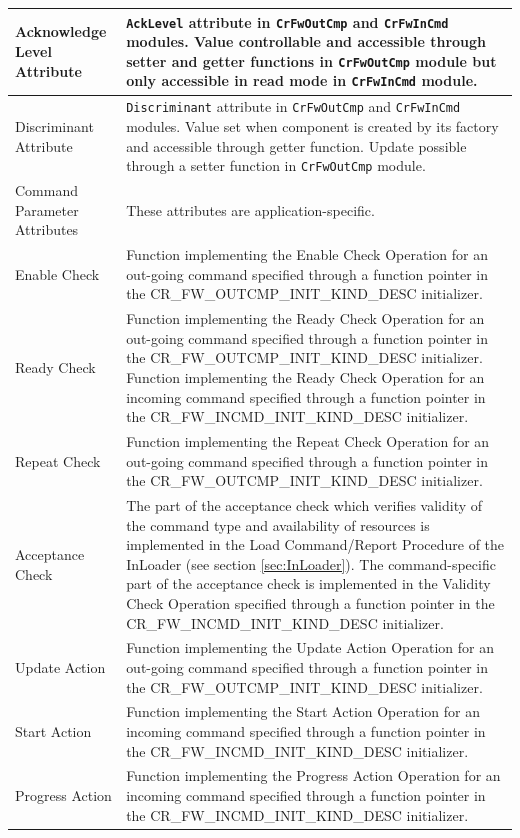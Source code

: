 \documentclass[a4paper,10pt]{article}
\begin{document}
\begin{longtable}{|>{\raggedright}p{2.0cm}|p{9.3cm}|}
\hline
Acknowledge Level Attribute & \texttt{AckLevel} attribute in \texttt{CrFwOutCmp} and \texttt{CrFwInCmd} modules. Value controllable and accessible through setter and getter functions in \texttt{CrFwOutCmp} module but only accessible in read mode in \texttt{CrFwInCmd} module. \\
\hline
Discriminant Attribute & \texttt{Discriminant} attribute in \texttt{CrFwOutCmp} and \texttt{CrFwInCmd} modules. Value set when component is created by its factory and accessible through getter function. Update possible through a setter function in \texttt{CrFwOutCmp} module.  \\
\hline
Command Parameter Attributes & These attributes are application-specific.  \\
\hline
Enable Check & Function implementing the Enable Check Operation for an out-going command specified through a function pointer in the CR\_FW\_OUTCMP\_INIT\_KIND\_DESC initializer.  \\
\hline
Ready Check & Function implementing the Ready Check Operation for an out-going command specified through a function pointer in the CR\_FW\_OUTCMP\_INIT\_KIND\_DESC initializer. Function implementing the Ready Check Operation for an incoming command specified through a function pointer in the CR\_FW\_INCMD\_INIT\_KIND\_DESC initializer. \\
\hline
Repeat Check & Function implementing the Repeat Check Operation for an out-going command specified through a function pointer in the CR\_FW\_OUTCMP\_INIT\_KIND\_DESC initializer.  \\
\hline
Acceptance Check & The part of the acceptance check which verifies validity of the command type and availability of resources is implemented in the Load Command/Report Procedure of the InLoader (see section \ref{sec:InLoader}). The command-specific part of the acceptance check is implemented in the Validity Check Operation specified through a function pointer in the CR\_FW\_INCMD\_INIT\_KIND\_DESC initializer.  \\
\hline
Update Action & Function implementing the Update Action Operation for an out-going command specified through a function pointer in the CR\_FW\_OUTCMP\_INIT\_KIND\_DESC initializer.  \\
\hline
Start Action & Function implementing the Start Action Operation for an incoming command specified through a function pointer in the CR\_FW\_INCMD\_INIT\_KIND\_DESC initializer. \\
\hline
Progress Action & Function implementing the Progress Action Operation for an incoming command specified through a function pointer in the CR\_FW\_INCMD\_INIT\_KIND\_DESC initializer. \\

\end{longtable}
\end{document}
